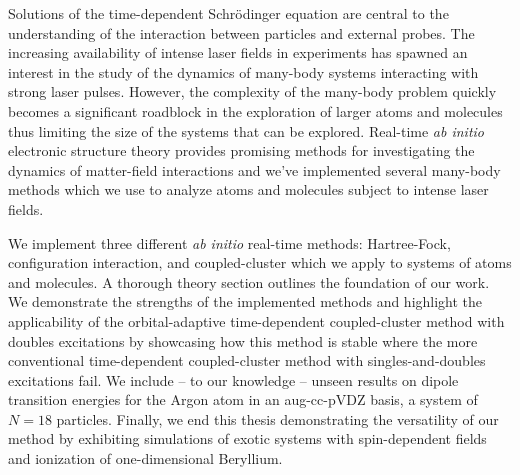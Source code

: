 Solutions of the time-dependent Schrödinger equation are central to the
understanding of the interaction between particles and external probes.
The increasing availability of intense laser fields in experiments has spawned
an interest in the study of the dynamics of many-body systems interacting with
strong laser pulses.
However, the complexity of the many-body problem quickly becomes a significant
roadblock in the exploration of larger atoms and molecules thus limiting the
size of the systems that can be explored.
Real-time \textit{ab initio} electronic structure theory provides promising
methods for investigating the dynamics of matter-field interactions and we've
implemented several many-body methods which we use to analyze atoms and
molecules subject to intense laser fields.

We implement three different \emph{ab initio} real-time methods: Hartree-Fock,
configuration interaction, and coupled-cluster which we apply to systems of
atoms and molecules.
A thorough theory section outlines the foundation of our work.
We demonstrate the strengths of the implemented methods and highlight the
applicability of the orbital-adaptive time-dependent coupled-cluster method with
doubles excitations by showcasing how this method is stable where the more
conventional time-dependent coupled-cluster method with singles-and-doubles
excitations fail.
We include -- to our knowledge -- unseen results on dipole transition energies
for the Argon atom in an aug-cc-pVDZ basis, a system of $N = 18$ particles.
Finally, we end this thesis demonstrating the versatility of our method by
exhibiting simulations of exotic systems with spin-dependent fields and
ionization of one-dimensional Beryllium.
